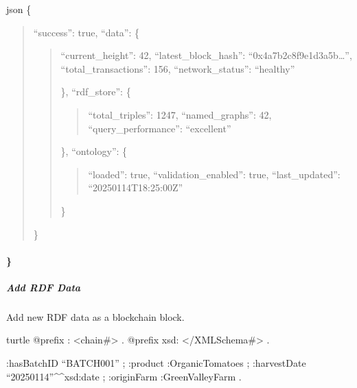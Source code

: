 \documentclass[letterpaper,10pt,english]{sphinxmanual}
\begin{document}
\sphinxAtStartPar
{}
{\color{red}\bfseries{}\textasciigrave{}\textasciigrave{}}{\color{red}\bfseries{}\textasciigrave{}}json
\{
\begin{quote}

\sphinxAtStartPar
“success”: true,
“data”: \{
\begin{quote}
\begin{description}
\sphinxAtStartPar
“current\_height”: 42,
“latest\_block\_hash”: “0x4a7b2c8f9e1d3a5b…”,
“total\_transactions”: 156,
“network\_status”: “healthy”

\end{description}

\sphinxAtStartPar
\},
“rdf\_store”: \{
\begin{quote}

\sphinxAtStartPar
“total\_triples”: 1247,
“named\_graphs”: 42,
“query\_performance”: “excellent”
\end{quote}

\sphinxAtStartPar
\},
“ontology”: \{
\begin{quote}

\sphinxAtStartPar
“loaded”: true,
“validation\_enabled”: true,
“last\_updated”: “2025\sphinxhyphen{}01\sphinxhyphen{}14T18:25:00Z”
\end{quote}

\sphinxAtStartPar
\}
\end{quote}

\sphinxAtStartPar
\}
\end{quote}


\paragraph{\}}
\label{\detokenize{api/rest-api:id15}}

\subparagraph{Add RDF Data}
\label{\detokenize{api/rest-api:add-rdf-data}}
\sphinxAtStartPar
Add new RDF data as a blockchain block.

\sphinxAtStartPar
{} 

\sphinxAtStartPar
{}

\sphinxAtStartPar
{}
{\color{red}\bfseries{}\textasciigrave{}\textasciigrave{}}{\color{red}\bfseries{}\textasciigrave{}}turtle
@prefix : \textless{}\sphinxhyphen{}chain\#\textgreater{} .
@prefix xsd: \textless{}/XMLSchema\#\textgreater{} .
\begin{description}
\sphinxAtStartPar
:hasBatchID “BATCH\sphinxhyphen{}001” ;
:product :OrganicTomatoes ;
:harvestDate “2025\sphinxhyphen{}01\sphinxhyphen{}14”\textasciicircum{}\textasciicircum{}xsd:date ;
:originFarm :GreenValleyFarm .

\end{description}
\end{document}

